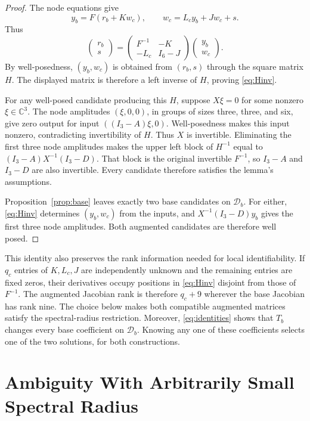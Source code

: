 \documentclass[letterpaper,10pt,conference]{ieeeconf}
\begin{document}
\begin{proof}
The node equations give
\[
 y_b=F(r_b+Kw_c),\qquad w_c=L_cy_b+Jw_c+s.
\]
Thus
\[
 \begin{pmatrix}r_b\\s\end{pmatrix}
 =\begin{pmatrix}F^{-1}&-K\\-L_c&I_6-J\end{pmatrix}
  \begin{pmatrix}y_b\\w_c\end{pmatrix}.
\]
By well-posedness, \((y_b,w_c)\) is obtained from \((r_b,s)\) through
the square matrix \(H\). The displayed matrix is therefore a left
inverse of \(H\), proving \eqref{eq:Hinv}.

For any well-posed candidate producing this \(H\), suppose
\(X\xi=0\) for some nonzero \(\xi\in\mathbb C^3\).
The node amplitudes \((\xi,0,0)\), in groups of sizes three, three,
and six, give zero output for input \(((I_3-A)\xi,0)\).
Well-posedness makes this input nonzero, contradicting invertibility
of \(H\). Thus \(X\) is invertible. Eliminating the first three
node amplitudes makes the upper left block of \(H^{-1}\) equal to
\((I_3-A)X^{-1}(I_3-D)\). That block is the original invertible
\(F^{-1}\), so \(I_3-A\) and \(I_3-D\) are also invertible.
Every candidate therefore satisfies the lemma's assumptions.

Proposition~\ref{prop:base} leaves exactly two base candidates on
\(\mathcal D_b\). For either, \eqref{eq:Hinv} determines
\((y_b,w_c)\) from the inputs, and \(X^{-1}(I_3-D)y_b\) gives
the first three node amplitudes. Both augmented candidates are
therefore well posed.
\end{proof}

This identity also preserves the rank information needed for local
identifiability. If \(q_c\) entries of \(K,L_c,J\) are independently
unknown and the remaining entries are fixed zeros, their derivatives
occupy positions in \eqref{eq:Hinv} disjoint from those of \(F^{-1}\).
The augmented Jacobian rank is therefore \(q_c+9\) wherever the base
Jacobian has rank nine. The choice below makes both compatible
augmented matrices satisfy the spectral-radius restriction.
Moreover, \eqref{eq:identities} shows that \(T_b\) changes every
base coefficient on \(\mathcal D_b\). Knowing any one of these
coefficients selects one of the two solutions, for both constructions.

\section{Ambiguity With Arbitrarily Small Spectral Radius}
\label{sec:main}
\end{document}

